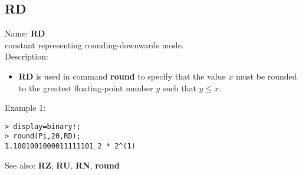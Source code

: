 \subsection{ RD }
\noindent Name: \textbf{RD}\\
constant representing rounding-downwards mode.\\

\noindent Description: \begin{itemize}

\item \textbf{RD} is used in command \textbf{round} to specify that the value $x$ must be rounded
   to the greatest floating-point number $y$ such that $y \le x$.
\end{itemize}
\noindent Example 1: 
\begin{center}\begin{minipage}{15cm}\begin{Verbatim}[frame=single]
> display=binary!;
> round(Pi,20,RD);
1.1001001000011111101_2 * 2^(1)
\end{Verbatim}
\end{minipage}\end{center}
See also: \textbf{RZ}, \textbf{RU}, \textbf{RN}, \textbf{round}
